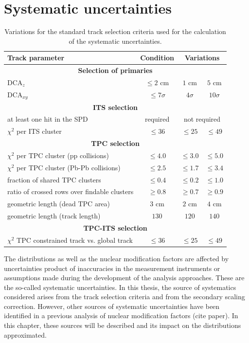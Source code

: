 \documentclass[12pt,a4paper]{report}
\begin{document}
\section{Systematic uncertainties}
\begin{table}[tb!]
\renewcommand{\arraystretch}{1.5}
\centering
\begin{tabular}{l c c c}
\toprule
\rowcolor{headerBlue}  \textbf{Track parameter} &  \textbf{Condition}  &  \multicolumn{2}{c}{\textbf{Variations}} \\
\midrule
\multicolumn{4}{c}{\textbf{Selection of primaries}} \\
\midrule
$\text{DCA}_{z}$ & $\leq 2 $ cm & $1$ cm & $5$ cm\\
$\text{DCA}_{xy}$ & $\leq 7\sigma$ & $4\sigma$ & $10\sigma$ \\
\midrule
\multicolumn{4}{c}{\textbf{ITS selection}} \\
\midrule
at least one hit in the SPD & required  & \multicolumn{2}{c}{not required}\\
$\chi^2$ per ITS cluster  & $\leq 36$ & $\leq 25$ & $\leq 49$ \\
\midrule
\multicolumn{4}{c}{\textbf{TPC selection}} \\
\midrule
$\chi^2$ per TPC cluster (pp collisions) & $\leq 4.0$  & $\leq 3.0$ & $\leq 5.0$\\
$\chi^2$ per TPC cluster (Pb-Pb collisions) & $\leq 2.5$ & $\leq 1.7$ & $\leq 3.4$\\
fraction of shared  TPC clusters&  $\leq 0.4$  & $\leq 0.2$ & $\leq 1.0$ \\
ratio of crossed rows over findable clusters  & $\geq 0.8$ & $\geq 0.7$ & $\geq 0.9$\\
geometric length (dead TPC area) & $3$ cm & $2$ cm & $4$ cm \\
geometric length (track length) & $130$ & $120$  & $140$ \\

\midrule
\multicolumn{4}{c}{\textbf{TPC-ITS selection}} \\
\midrule
$\chi^2$ TPC constrained track vs. global track  & $\leq 36$ & $\leq 25$ & $\leq 49$ \\
\bottomrule
\end{tabular}
\caption{Variations for the standard track selection criteria used for the calculation of the systematic uncertainties.}
\label{tab:curVar}
\end{table}
The \pt distributions as well as the nuclear modification factors are affected by uncertainties product of inaccuracies in the measurement instruments or assumptions made during the development of the analysis approaches. These are the so-called systematic uncertainties. In this thesis, the source of systematics considered arises from the track selection criteria and from the secondary scaling correction. However, other sources of systematic uncertainties have been identified in a previous analysis of nuclear modification factors (cite paper). In this chapter, these sources will be described and its impact on the \pt distributions approximated.\\
\end{document}
